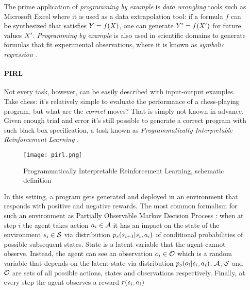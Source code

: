 The prime application of \emph{programming by example} is \emph{data wrangling} tools such as Microsoft Excel \cite{gulwaniProgrammingExamplesandIts2016} where it is used as a data extrapolation tool: if a formula $f$ can be synthesized that satisfies $Y=f(X)$, one can generate $Y '=f(X ')$ for future values $X '$.
\emph{Programming by example} is also used in scientific domains to generate formulas that fit experimental observations, where it is known as \emph{symbolic regression} \cite{makkeInterpretableScientificDiscovery2022}.

\paragraph{PIRL}

Not every task, however, can be easily described with input-output examples. 
Take chess: it's relatively simple to evaluate the performance of a chess-playing program, but what are the \emph{correct} moves? 
That is simply not known in advance.
Given enough trial and error it's still possible to generate a correct program with such black box specification, a task known as \emph{Programmatically Interpretable Reinforcement Learning} \cite{pirl}.

\begin{figure}[H]
    \centering
    \texttt{[image: pirl.png]}
    \caption{Programmatically Interpretable Reinforcement Learning, schematic definition}
    \label{fig:pirl}
\end{figure}

In this setting, a program gets generated and deployed in an environment that responds with positive and negative rewards. 
The most common formalism for such an environment as Partially Observable Markov Decision Process \cite{kramerjdavidrPartiallyObservableMarkov1964, spaanPartiallyObservableMarkov2012}: when at step $i$ the agent takes action $a_i \in \mathcal{A}$ it has an impact on  the state of the environment $s_i \in \mathcal{S}$ via distribution $p_s(s_{i+1} | s_i, a_i)$ of conditional probabilities of possible subsequent states. 
State is a latent variable that the agent cannot observe.
Instead, the agent can see an observation $o_i \in \mathcal{O}$ which is a random variable that depends on the latent state via distribution $p_o(o_i | s_i, a_i)$.
$\mathcal{A}$, $\mathcal{S}$ and $\mathcal{O}$ are sets of all possible actions, states and observations respectively.
Finally, at every step the agent observes a reward $r(s_i,a_i)$

